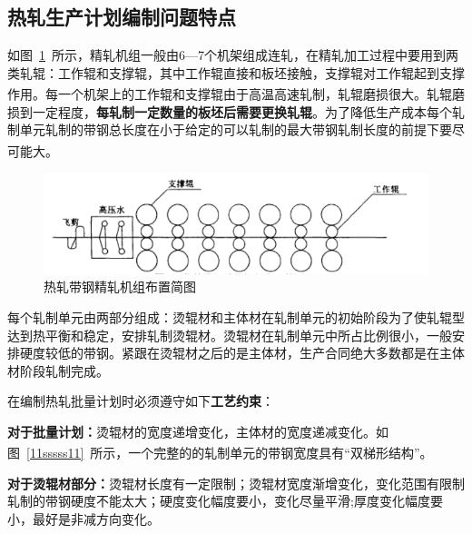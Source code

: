 \documentclass{whutmod}
\newcommand{\upcite}[1]{\textsuperscript{\cite{#1}}}
\begin{document}
	\subsection{热轧生产计划编制问题特点}
如图~\ref{1111sssss11}~所示，精轧机组一般由6—7个机架组成连轧，在精轧加工过程中要用到两类轧辊：工作辊和支撑辊，其中工作辊直接和板坯接触，支撑辊对工作辊起到支撑作用\upcite{5}。每一个机架上的工作辊和支撑辊由于高温高速轧制，轧辊磨损很大。轧辊磨损到一定程度，\textbf{每轧制一定数量的板坯后需要更换轧辊}。为了降低生产成本每个轧制单元轧制的带钢总长度在小于给定的可以轧制的最大带钢轧制长度的前提下要尽可能大\upcite{5}。
	\begin{figure}[H]
	\centering
	\includegraphics[width=1.05\textwidth]{figures/demo.png}
	\caption{热轧带钢精轧机组布置简图}\label{1111sssss11}
\end{figure}
 每个轧制单元由两部分组成：烫辊材和主体材在轧制单元的初始阶段为了使轧辊型达到热平衡和稳定，安排轧制烫辊材。烫辊材在轧制单元中所占比例很小，一般安排硬度较低的带钢。紧跟在烫辊材之后的是主体材，生产合同绝大多数都是在主体材阶段轧制完成。


	
	在编制热轧批量计划时必须遵守如下\textbf{工艺约束}：
                                          
	\textbf{对于批量计划：}烫辊材的宽度递增变化，主体材的宽度递减变化。如图~\ref{11sssss11}~所示，一个完整的的轧制单元的带钢宽度具有“双梯形结构”\upcite{6}。
	
	    \textbf{对于烫辊材部分：}烫辊材长度有一定限制；烫辊材宽度渐增变化，变化范围有限制轧制的带钢硬度不能太大；硬度变化幅度要小，变化尽量平滑;厚度变化幅度要小，最好是非减方向变化。
	
\end{document}
